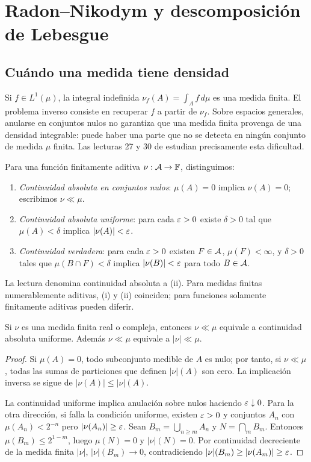 \chapter{Radon--Nikodym y descomposición de Lebesgue}\label{v2:cap13}\label{cap:v2-13}
\section{Cuándo una medida tiene densidad}\label{lectura:v2-27}
Si $f\in L^1(\mu)$, la integral indefinida $\nu_f(A)=\int_A f\,d\mu$ es una medida finita. El problema inverso consiste en recuperar $f$ a partir de $\nu_f$. Sobre espacios generales, anularse en conjuntos nulos no garantiza que una medida finita provenga de una densidad integrable: puede haber una parte que no se detecta en ningún conjunto de medida $\mu$ finita. Las lecturas 27 y 30 de \cite{valencia2} estudian precisamente esta dificultad.
\begin{definicion}
Para una función finitamente aditiva $\nu:\mathcal A\to\mathbb F$, distinguimos:
\begin{enumerate}
\item \emph{Continuidad absoluta en conjuntos nulos}: $\mu(A)=0$ implica $\nu(A)=0$; escribimos $\nu\ll\mu$.
\item \emph{Continuidad absoluta uniforme}: para cada $\varepsilon>0$ existe $\delta>0$ tal que $\mu(A)<\delta$ implica $|\nu(A)|<\varepsilon$.
\item \emph{Continuidad verdadera}: para cada $\varepsilon>0$ existen $F\in\mathcal A$, $\mu(F)<\infty$, y $\delta>0$ tales que $\mu(B\cap F)<\delta$ implica $|\nu(B)|<\varepsilon$ para todo $B\in\mathcal A$.
\end{enumerate}
La lectura denomina continuidad absoluta a (ii). Para medidas finitas numerablemente aditivas, (i) y (ii) coinciden; para funciones solamente finitamente aditivas pueden diferir.
\end{definicion}
\begin{lema}\label{v2:absoluta-equivalencia}
Si $\nu$ es una medida finita real o compleja, entonces $\nu\ll\mu$ equivale a continuidad absoluta uniforme. Además $\nu\ll\mu$ equivale a $|\nu|\ll\mu$.
\end{lema}
\begin{proof}
Si $\mu(A)=0$, todo subconjunto medible de $A$ es nulo; por tanto, si $\nu\ll\mu$, todas las sumas de particiones que definen $|\nu|(A)$ son cero. La implicación inversa se sigue de $|\nu(A)|\le|\nu|(A)$.

La continuidad uniforme implica anulación sobre nulos haciendo $\varepsilon\downarrow0$. Para la otra dirección, si falla la condición uniforme, existen $\varepsilon>0$ y conjuntos $A_n$ con $\mu(A_n)<2^{-n}$ pero $|\nu(A_n)|\ge\varepsilon$. Sean $B_m=\bigcup_{n\ge m}A_n$ y $N=\bigcap_m B_m$. Entonces $\mu(B_m)\le2^{1-m}$, luego $\mu(N)=0$ y $|\nu|(N)=0$. Por continuidad decreciente de la medida finita $|\nu|$, $|\nu|(B_m)\to0$, contradiciendo $|\nu|(B_m)\ge|\nu(A_m)|\ge\varepsilon$.
\end{proof}
